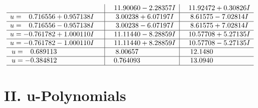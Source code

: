 \documentclass[1p]{elsarticle_modified}
\theoremstyle{definition}
\begin{document}
$$\begin{array}{c|c|c}
 & \phantom{-}11.90060 - 2.28357 I & \phantom{-}11.92472 + 0.30826 I \\ \hline\begin{aligned}
u &= \phantom{-}0.716556 + 0.957138 I\end{aligned}
 & \phantom{-}3.00238 + 6.07197 I & \phantom{-}8.61575 - 7.02814 I \\ \hline\begin{aligned}
u &= \phantom{-}0.716556 - 0.957138 I\end{aligned}
 & \phantom{-}3.00238 - 6.07197 I & \phantom{-}8.61575 + 7.02814 I \\ \hline\begin{aligned}
u &= -0.761782 + 1.000110 I\end{aligned}
 & \phantom{-}11.11440 - 8.28859 I & \phantom{-}10.57708 + 5.27135 I \\ \hline\begin{aligned}
u &= -0.761782 - 1.000110 I\end{aligned}
 & \phantom{-}11.11440 + 8.28859 I & \phantom{-}10.57708 - 5.27135 I \\ \hline\begin{aligned}
u &= \phantom{-}0.689113\phantom{ +0.000000I}\end{aligned}
 & \phantom{-}8.00657\phantom{ +0.000000I} & \phantom{-}12.1480\phantom{ +0.000000I} \\ \hline\begin{aligned}
u &= -0.384812\phantom{ +0.000000I}\end{aligned}
 & \phantom{-}0.764093\phantom{ +0.000000I} & \phantom{-}13.0940\phantom{ +0.000000I}\\
 \hline 
 \end{array}$$\newpage
\newpage\renewcommand{\arraystretch}{1}
\centering \section*{ II. u-Polynomials}
\end{document}
